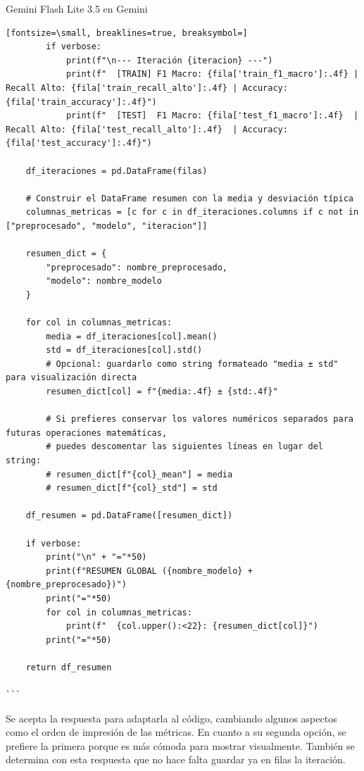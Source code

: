 \documentclass[12pt,a4paper,oneside]{book}
\begin{document}
\begin{iaresp}{Gemini Flash Lite 3.5 en Gemini}
\begin{Verbatim}[fontsize=\small, breaklines=true, breaksymbol=]
        if verbose:
            print(f"\n--- Iteración {iteracion} ---")
            print(f"  [TRAIN] F1 Macro: {fila['train_f1_macro']:.4f} | Recall Alto: {fila['train_recall_alto']:.4f} | Accuracy: {fila['train_accuracy']:.4f}")
            print(f"  [TEST]  F1 Macro: {fila['test_f1_macro']:.4f}  | Recall Alto: {fila['test_recall_alto']:.4f}  | Accuracy: {fila['test_accuracy']:.4f}")
            
    df_iteraciones = pd.DataFrame(filas)
    
    # Construir el DataFrame resumen con la media y desviación típica
    columnas_metricas = [c for c in df_iteraciones.columns if c not in ["preprocesado", "modelo", "iteracion"]]
    
    resumen_dict = {
        "preprocesado": nombre_preprocesado,
        "modelo": nombre_modelo
    }
    
    for col in columnas_metricas:
        media = df_iteraciones[col].mean()
        std = df_iteraciones[col].std()
        # Opcional: guardarlo como string formateado "media ± std" para visualización directa
        resumen_dict[col] = f"{media:.4f} ± {std:.4f}"
        
        # Si prefieres conservar los valores numéricos separados para futuras operaciones matemáticas,
        # puedes descomentar las siguientes líneas en lugar del string:
        # resumen_dict[f"{col}_mean"] = media
        # resumen_dict[f"{col}_std"] = std

    df_resumen = pd.DataFrame([resumen_dict])
    
    if verbose:
        print("\n" + "="*50)
        print(f"RESUMEN GLOBAL ({nombre_modelo} + {nombre_preprocesado})")
        print("="*50)
        for col in columnas_metricas:
            print(f"  {col.upper():<22}: {resumen_dict[col]}")
        print("="*50)
        
    return df_resumen

```
\end{Verbatim}
\end{iaresp}
\begin{iaanalisis}
Se acepta la respuesta para adaptarla al código, cambiando algunos aspectos como el orden de impresión de las métricas. En cuanto a su segunda opción, se prefiere la primera porque es más cómoda para mostrar visualmente. También se determina con esta respuesta que no hace falta guardar ya en filas la iteración. 
\end{iaanalisis}
\end{document}
